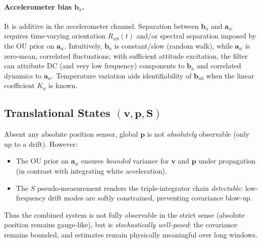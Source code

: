 \documentclass[10pt]{extarticle}
\begin{document}
\paragraph{Accelerometer bias $\bm b_a$.} It is additive in the accelerometer channel.
Separation between $\bm b_a$ and $\bm a_w$ requires time-varying orientation $R_{wb}(t)$
and/or spectral separation imposed by the OU prior on $\bm a_w$. Intuitively, $\bm b_a$
is constant/slow (random walk), while $\bm a_w$ is zero-mean, correlated fluctuations;
with sufficient attitude excitation, the filter can attribute DC (and very low frequency)
components to $\bm b_a$ and correlated dynamics to $\bm a_w$. Temperature variation aids
identifiability of $\bm b_{a0}$ when the linear coefficient $K_a$ is known.

\subsection{Translational States \texorpdfstring{$(\bm v,\bm p,\bm S)$}{plain-text}}
Absent any absolute position sensor, global $\bm p$ is not \emph{absolutely} observable
(only up to a drift). However:
\begin{itemize}
\item The OU prior on $\bm a_w$ ensures \emph{bounded} variance for $\bm v$ and $\bm p$
under propagation (in contrast with integrating white acceleration).
\item The $S$ pseudo-measurement renders the triple-integrator chain \emph{detectable}:
low-frequency drift modes are softly constrained, preventing covariance blow-up.
\end{itemize}
Thus the combined system is not fully observable in the strict sense (absolute position
remains gauge-like), but is \emph{stochastically well-posed}: the covariance remains bounded,
and estimates remain physically meaningful over long windows.
\end{document}
